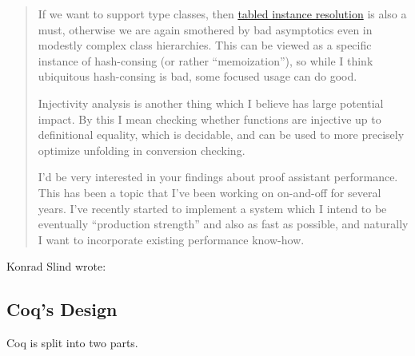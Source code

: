 \begin{subappendices}
\begin{minorcomment}
\begin{quotation}
If we want to support type classes, then \href{https://arxiv.org/pdf/2001.04301.pdf}{tabled instance resolution} \textcite{Tabled2020Selsam} is also a must, otherwise we are again smothered by bad asymptotics even in modestly complex class hierarchies. This can be viewed as a specific instance of hash-consing (or rather ``memoization''), so while I think ubiquitous hash-consing is bad, some focused usage can do good.

Injectivity analysis is another thing which I believe has large potential impact. By this I mean checking whether functions are injective up to definitional equality, which is decidable, and can be used to more precisely optimize unfolding in conversion checking.

I'd be very interested in your findings about proof assistant performance. This has been a topic that I've been working on on-and-off for several years. I've recently started to implement a system which I intend to be eventually ``production strength'' and also as fast as possible, and naturally I want to incorporate existing performance know-how.
\end{quotation}
\end{minorcomment}
\begin{minorcomment}
  Konrad Slind wrote:
\end{minorcomment}


\begin{minorcomment}
\section{Coq's Design}
\end{minorcomment}
\begin{minorcomment}
Coq is split into two parts.


\end{minorcomment}
\end{subappendices}
